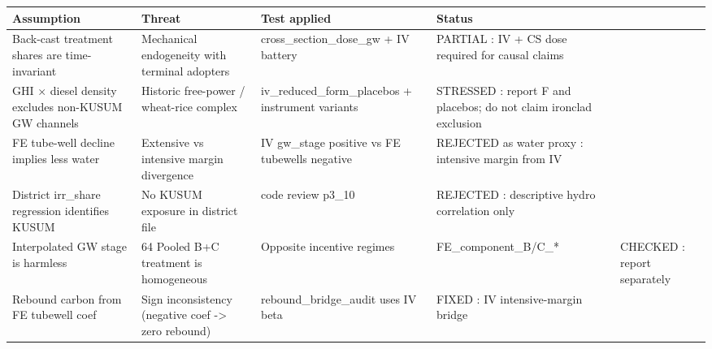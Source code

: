 \begin{tabular}{llll}
\toprule
Assumption & Threat & Test applied & Status \\
\midrule
Back-cast treatment shares are time-invariant & Mechanical endogeneity with terminal adopters & cross_section_dose_gw + IV battery & PARTIAL : IV + CS dose required for causal claims \\
GHI × diesel density excludes non-KUSUM GW channels & Historic free-power / wheat-rice complex & iv_reduced_form_placebos + instrument variants & STRESSED : report F and placebos; do not claim ironclad exclusion \\
FE tube-well decline implies less water & Extensive vs intensive margin divergence & IV gw_stage positive vs FE tubewells negative & REJECTED as water proxy : intensive margin from IV \\
District irr_share regression identifies KUSUM & No KUSUM exposure in district file & code review p3_10 & REJECTED : descriptive hydro correlation only \\
Interpolated GW stage is harmless & 64%
Pooled B+C treatment is homogeneous & Opposite incentive regimes & FE_component_B/C_* & CHECKED : report separately \\
Rebound carbon from FE tubewell coef & Sign inconsistency (negative coef -> zero rebound) & rebound_bridge_audit uses IV beta & FIXED : IV intensive-margin bridge \\
\bottomrule
\end{tabular}
